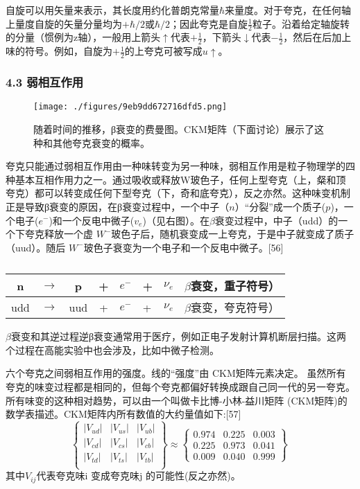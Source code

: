 自旋可以用矢量来表示，其长度用约化普朗克常量$\hbar$来量度。对于夸克，在任何轴上量度自旋的矢量分量均为$+\hbar/2$或$\hbar/2$；因此夸克是自旋$\frac{1}{2}$粒子。沿着给定轴旋转的分量（惯例为z轴），一般用上箭头$\uparrow$代表$+\frac{1}{2}$，下箭头$\downarrow$代表$-\frac{1}{2}$，然后在后加上味的符号。例如，自旋为$+\frac{1}{2}$的上夸克可被写成$u\uparrow$。


\subsubsection{4.3 弱相互作用}
\begin{figure}[ht]
\centering
\texttt{[image: ./figures/9eb9dd672716dfd5.png]}
\caption{随着时间的推移，β衰变的费曼图。CKM矩阵（下面讨论）展示了这种和其他夸克衰变的概率。} \label{fig_Quark_5}
\end{figure}
夸克只能通过弱相互作用由一种味转变为另一种味，弱相互作用是粒子物理学的四种基本互相作用力之一。通过吸收或释放W玻色子，任何上型夸克（上，粲和顶夸克）都可以转变成任何下型夸克（下，奇和底夸克），反之亦然。这种味变机制正是导致β衰变的原因，在β衰变过程中，一个中子（$n$）“分裂”成一个质子($p$)，一个电子($e^{-}$)和一个反电中微子($v_e$)（见右图）。在$\beta$衰变过程中，中子（udd）的一个下夸克释放一个虚 $W^{-}$玻色子后，随机衰变成一上夸克，于是中子就变成了质子（uud）。随后 $W^{-}$玻色子衰变为一个电子和一个反电中微子。[56]
\begin{table}[ht]
\centering
\caption\label{Quark}
\begin{tabular}{|c|c|c|c}
\hline
n & $\rightarrow$ & p & + & $e^{-}$ & + &  $\nu_{e}$ & $\beta$衰变，重子符号） \\
\hline
udd & $\rightarrow$ & uud & + & $e^{-}$ & + & $\nu_{e}$ &$\beta$衰变，夸克符号） \\
\hline
\end{tabular}
\end{table}
$\beta$衰变和其逆过程逆β衰变通常用于医疗，例如正电子发射计算机断层扫描。这两个过程在高能实验中也会涉及，比如中微子检测。

六个夸克之间弱相互作用的强度。线的“强度”由 CKM矩阵元素决定。
虽然所有夸克的味变过程都是相同的，但每个夸克都偏好转换成跟自己同一代的另一夸克。所有味变的这种相对趋势，可以由一个叫做卡比博-小林-益川矩阵 (CKM矩阵)的数学表描述。CKM矩阵内所有数值的大约量值如下:[57]
\begin{equation}
\begin{Bmatrix}
|V_{ud}| & |V_{us}|& |V_{ub}| \\
|V_{cd}| & |V_{cs}| & |V_{cb}| \\
|V_{td}| & |V_{ts}| & |V_{tb}| \\
\end{Bmatrix}
\approx
\begin{Bmatrix}
0.974 & 0.225 & 0.003 \\
0.225 & 0.973 & 0.041 \\
0.009 & 0.040 & 0.999
\end{Bmatrix}~
\end{equation}
其中$V_{ij}$代表夸克味i 变成夸克味j 的可能性(反之亦然)。

